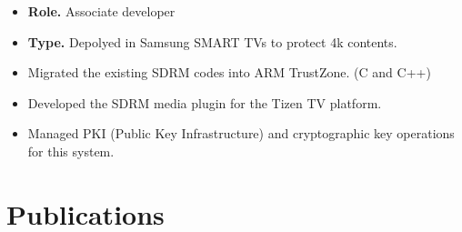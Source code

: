 \documentclass[10pt, a4paper]{article}
\begin{document}
\begin{EntriesTable}
\begin{itemize}
    \item \textbf{Role.} Associate developer
    \item \textbf{Type.} Depolyed in Samsung SMART TVs to protect 4k contents.
    \item Migrated the existing SDRM codes into ARM TrustZone. (C and C++)
    \item Developed the SDRM media plugin for the Tizen TV platform.
    \item Managed PKI (Public Key Infrastructure) and cryptographic key operations for this system.
  \end{itemize}
\end{EntriesTable}

\section{Publications}
\end{document}
